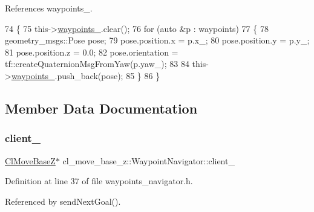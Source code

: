 References waypoints\+\_\+.


\begin{DoxyCode}
74 \{
75   this->\hyperlink{classcl__move__base__z_1_1WaypointNavigator_a727f6a73e15ff5dc6bb3ffdf52c3d832}{waypoints\_}.clear();
76   \textcolor{keywordflow}{for} (\textcolor{keyword}{auto} &p : waypoints)
77   \{
78     geometry\_msgs::Pose pose;
79     pose.position.x = p.x\_;
80     pose.position.y = p.y\_;
81     pose.position.z = 0.0;
82     pose.orientation = tf::createQuaternionMsgFromYaw(p.yaw\_);
83 
84     this->\hyperlink{classcl__move__base__z_1_1WaypointNavigator_a727f6a73e15ff5dc6bb3ffdf52c3d832}{waypoints\_}.push\_back(pose);
85   \}
86 \}
\end{DoxyCode}


\subsection{Member Data Documentation}
\mbox{\label{classcl__move__base__z_1_1WaypointNavigator_afc5ad5c5d15f41437286b8fca1d3a324}} 
\subsubsection{\texorpdfstring{client\+\_\+}{client\_}}
{\footnotesize\ttfamily \hyperlink{classcl__move__base__z_1_1ClMoveBaseZ}{Cl\+Move\+BaseZ}$\ast$ cl\+\_\+move\+\_\+base\+\_\+z\+::\+Waypoint\+Navigator\+::client\+\_\+}



Definition at line 37 of file waypoints\+\_\+navigator.\+h.



Referenced by send\+Next\+Goal().

\mbox{\label{classcl__move__base__z_1_1WaypointNavigator_a82859e418592c2392c20a2d11b9836eb}} 

